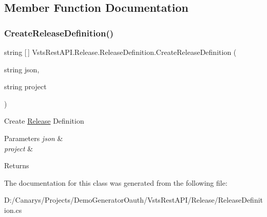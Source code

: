 \subsection{Member Function Documentation}
\mbox{\label{class_vsts_rest_a_p_i_1_1_release_1_1_release_definition_a3e03bd4ea027dca1c1cda2e0fe8ca73d}} 
\subsubsection{\texorpdfstring{Create\+Release\+Definition()}{CreateReleaseDefinition()}}
{\footnotesize\ttfamily string \mbox{[}$\,$\mbox{]} Vsts\+Rest\+A\+P\+I.\+Release.\+Release\+Definition.\+Create\+Release\+Definition (\begin{DoxyParamCaption}\item[{string}]{json,  }\item[{string}]{project }\end{DoxyParamCaption})}



Create \mbox{\hyperlink{namespace_vsts_rest_a_p_i_1_1_release}{Release}} Definition 


\begin{DoxyParams}{Parameters}
{\em json} & \\
\hline
{\em project} & \\
\hline
\end{DoxyParams}
\begin{DoxyReturn}{Returns}

\end{DoxyReturn}


The documentation for this class was generated from the following file\+:\begin{DoxyCompactItemize}
\item 
D\+:/\+Canarys/\+Projects/\+Demo\+Generator\+Oauth/\+Vsts\+Rest\+A\+P\+I/\+Release/Release\+Definition.\+cs\end{DoxyCompactItemize}
